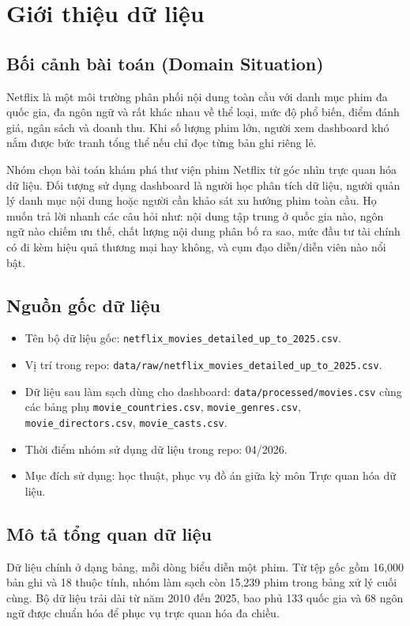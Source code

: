 \section{Giới thiệu dữ liệu}

\subsection{Bối cảnh bài toán (Domain Situation)}
Netflix là một môi trường phân phối nội dung toàn cầu với danh mục phim đa quốc gia, đa ngôn ngữ và rất khác nhau về thể loại, mức độ phổ biến, điểm đánh giá, ngân sách và doanh thu. Khi số lượng phim lớn, người xem dashboard khó nắm được bức tranh tổng thể nếu chỉ đọc từng bản ghi riêng lẻ.

Nhóm chọn bài toán khám phá thư viện phim Netflix từ góc nhìn trực quan hóa dữ liệu. Đối tượng sử dụng dashboard là người học phân tích dữ liệu, người quản lý danh mục nội dung hoặc người cần khảo sát xu hướng phim toàn cầu. Họ muốn trả lời nhanh các câu hỏi như: nội dung tập trung ở quốc gia nào, ngôn ngữ nào chiếm ưu thế, chất lượng nội dung phân bố ra sao, mức đầu tư tài chính có đi kèm hiệu quả thương mại hay không, và cụm đạo diễn/diễn viên nào nổi bật.

\subsection{Nguồn gốc dữ liệu}
\begin{itemize}[leftmargin=2em]
    \item Tên bộ dữ liệu gốc: \texttt{netflix\_movies\_detailed\_up\_to\_2025.csv}.
    \item Vị trí trong repo: \texttt{data/raw/netflix\_movies\_detailed\_up\_to\_2025.csv}.
    \item Dữ liệu sau làm sạch dùng cho dashboard: \texttt{data/processed/movies.csv} cùng các bảng phụ \texttt{movie\_countries.csv}, \texttt{movie\_genres.csv}, \texttt{movie\_directors.csv}, \texttt{movie\_casts.csv}.
    \item Thời điểm nhóm sử dụng dữ liệu trong repo: 04/2026.
    \item Mục đích sử dụng: học thuật, phục vụ đồ án giữa kỳ môn Trực quan hóa dữ liệu.
\end{itemize}

\subsection{Mô tả tổng quan dữ liệu}
Dữ liệu chính ở dạng bảng, mỗi dòng biểu diễn một phim. Từ tệp gốc gồm 16{,}000 bản ghi và 18 thuộc tính, nhóm làm sạch còn 15{,}239 phim trong bảng xử lý cuối cùng. Bộ dữ liệu trải dài từ năm 2010 đến 2025, bao phủ 133 quốc gia và 68 ngôn ngữ được chuẩn hóa để phục vụ trực quan hóa đa chiều.


